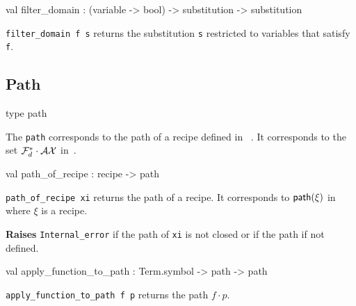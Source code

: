 \label{val:Recipe.filter-underscoredomain}\begin{ocamldoccode}
val filter_domain : (variable -> bool) -> substitution -> substitution
\end{ocamldoccode}
\begin{ocamldocdescription}
{\tt{filter\_domain f s}} returns the substitution {\tt{s}} restricted to variables that satisfy {\tt{f}}.


\end{ocamldocdescription}




\subsection{Path}




\label{type:Recipe.path}\begin{ocamldoccode}
type path 
\end{ocamldoccode}
\begin{ocamldocdescription}
The {\tt{path}} corresponds to the path of a recipe defined in ~.
    It corresponds to the set $\mathcal{F}_d^* \cdot \mathcal{AX}$ in~\thesis.


\end{ocamldocdescription}




\label{val:Recipe.path-underscoreof-underscorerecipe}\begin{ocamldoccode}
val path_of_recipe : recipe -> path
\end{ocamldoccode}
\begin{ocamldocdescription}
{\tt{path\_of\_recipe xi}} returns the path of a recipe. It corresponds to $\mathsf{path}(\xi)$ in~\thesis~
    where $\xi$ is a recipe.

{\bf Raises} {\tt{Internal\_error}} if the path of {\tt{xi}} is not closed or if the path if not defined.


\end{ocamldocdescription}




\label{val:Recipe.apply-underscorefunction-underscoreto-underscorepath}\begin{ocamldoccode}
val apply_function_to_path : Term.symbol -> path -> path
\end{ocamldoccode}
\begin{ocamldocdescription}
{\tt{apply\_function\_to\_path f p}} returns the path $f \cdot p$. 


\end{ocamldocdescription}




